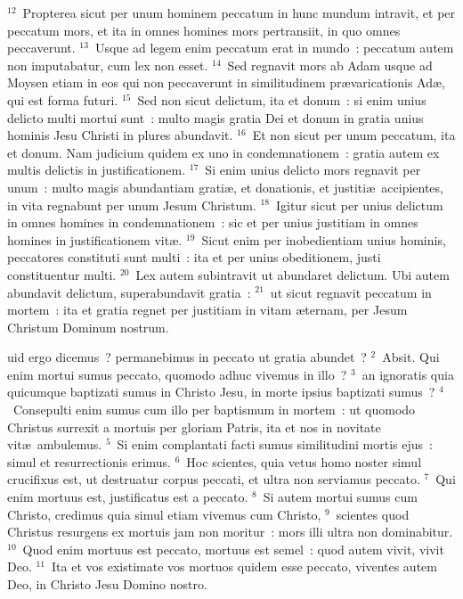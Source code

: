 ${}^{12}$~Propterea sicut per unum hominem peccatum in hunc mundum intravit, et per peccatum mors, et ita in omnes homines mors pertransiit, in quo omnes peccaverunt.
${}^{13}$~Usque ad legem enim peccatum erat in mundo~: peccatum autem non imputabatur, cum lex non esset.
${}^{14}$~Sed regnavit mors ab Adam usque ad Moysen etiam in eos qui non peccaverunt in similitudinem pr\ae varicationis Ad\ae , qui est forma futuri.
${}^{15}$~Sed non sicut delictum, ita et donum~: si enim unius delicto multi mortui sunt~: multo magis gratia Dei et donum in gratia unius hominis Jesu Christi in plures abundavit.
${}^{16}$~Et non sicut per unum peccatum, ita et donum. Nam judicium quidem ex uno in condemnationem~: gratia autem ex multis delictis in justificationem.
${}^{17}$~Si enim unius delicto mors regnavit per unum~: multo magis abundantiam grati\ae , et donationis, et justiti\ae\ accipientes, in vita regnabunt per unum Jesum Christum.
${}^{18}$~Igitur sicut per unius delictum in omnes homines in condemnationem~: sic et per unius justitiam in omnes homines in justificationem vit\ae .
${}^{19}$~Sicut enim per inobedientiam unius hominis, peccatores constituti sunt multi~: ita et per unius obeditionem, justi constituentur multi.
${}^{20}$~Lex autem subintravit ut abundaret delictum. Ubi autem abundavit delictum, superabundavit gratia~:
${}^{21}$~ut sicut regnavit peccatum in mortem~: ita et gratia regnet per justitiam in vitam \ae ternam, per Jesum Christum Dominum nostrum.

\bchapter
{}uid ergo dicemus~? permanebimus in peccato ut gratia abundet~?
${}^{2}$~Absit. Qui enim mortui sumus peccato, quomodo adhuc vivemus in illo~?
${}^{3}$~an ignoratis quia quicumque baptizati sumus in Christo Jesu, in morte ipsius baptizati sumus~?
${}^{4}$~Consepulti enim sumus cum illo per baptismum in mortem~: ut quomodo Christus surrexit a mortuis per gloriam Patris, ita et nos in novitate vit\ae\ ambulemus.
${}^{5}$~Si enim complantati facti sumus similitudini mortis ejus~: simul et resurrectionis erimus.
${}^{6}$~Hoc scientes, quia vetus homo noster simul crucifixus est, ut destruatur corpus peccati, et ultra non serviamus peccato.
${}^{7}$~Qui enim mortuus est, justificatus est a peccato.
${}^{8}$~Si autem mortui sumus cum Christo, credimus quia simul etiam vivemus cum Christo,
${}^{9}$~scientes quod Christus resurgens ex mortuis jam non moritur~: mors illi ultra non dominabitur.
${}^{10}$~Quod enim mortuus est peccato, mortuus est semel~: quod autem vivit, vivit Deo.
${}^{11}$~Ita et vos existimate vos mortuos quidem esse peccato, viventes autem Deo, in Christo Jesu Domino nostro.


